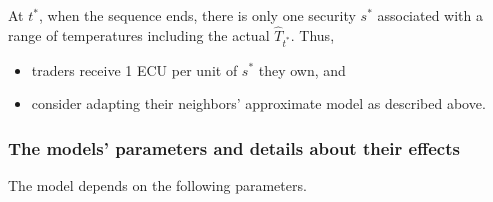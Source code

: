 \documentclass[10pt,a4paper]{article}
\begin{document}
 	
 	At $t^*$, when the sequence ends, there is only one security $s^*$ associated with a range of temperatures including the actual $\hat{T}_{t^*}$. Thus,
 	\begin{itemize}
 			\setlength\itemsep{0em}
 		\item traders receive 1 ECU per unit of $s^*$ they own, and
 		\item  consider adapting their neighbors' approximate model as described above.
 	\end{itemize}
 	
 	\subsubsection{The models' parameters and details about their effects}
 	\label{param}
 	
 The model depends on the following parameters. 
\end{document}
